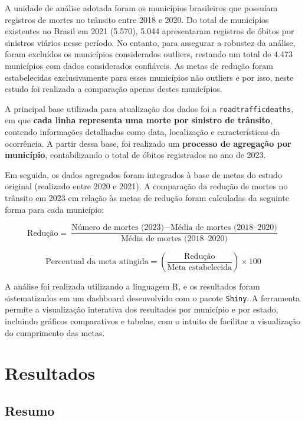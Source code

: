 \documentclass[
  letterpaper,
  DIV=11,
  numbers=noendperiod]{scrreprt}
\begin{document}
A unidade de análise adotada foram os municípios brasileiros que
possuíam registros de mortes no trânsito entre 2018 e 2020. Do total de
municípios existentes no Brasil em 2021 (5.570), 5.044 apresentaram
registros de óbitos por sinistros viários nesse período. No entanto,
para assegurar a robustez da análise, foram excluídos os municípios
considerados outliers, restando um total de 4.473 municípios com dados
considerados confiáveis. As metas de redução foram estabelecidas
exclusivamente para esses municípios não outliers e por isso, neste
estudo foi realizada a comparação apenas destes municípios.

A principal base utilizada para atualização dos dados foi a
\texttt{roadtrafficdeaths}, em que \textbf{cada linha representa uma
morte por sinistro de trânsito}, contendo informações detalhadas como
data, localização e características da ocorrência. A partir dessa base,
foi realizado um \textbf{processo de agregação por município},
contabilizando o total de óbitos registrados no ano de 2023.

Em seguida, os dados agregados foram integrados à base de metas do
estudo original (realizado entre 2020 e 2021). A comparação da redução
de mortes no trânsito em 2023 em relação às metas de redução foram
calculadas da seguinte forma para cada município:

\[
\text{Redução} = \frac{\text{Número de mortes (2023)} - \text{Média de mortes (2018–2020)}}{\text{Média de mortes (2018–2020)}}
\]

\[
\text{Percentual da meta atingida} = \left( \frac{\text{Redução}}{\text{Meta estabelecida}} \right) \times 100
\]

A análise foi realizada utilizando a linguagem R, e os resultados foram
sistematizados em um dashboard desenvolvido com o pacote \texttt{Shiny}.
A ferramenta permite a visualização interativa dos resultados por
município e por estado, incluindo gráficos comparativos e tabelas, com o
intuito de facilitar a visualização do cumprimento das metas.


\chapter{Resultados}\label{resultados}

\section{Resumo}\label{resumo-1}
\end{document}
